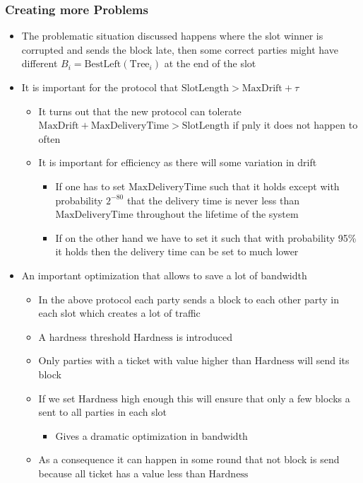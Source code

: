 \documentclass[11pt]{article}
\begin{document}
\subsubsection{Creating more Problems}
\label{sec:orge44a70d}
\begin{itemize}
\item The problematic situation discussed happens where the slot winner is corrupted and sends the block late, then some correct parties might have different \(B_i=\text{BestLeft}(\text{Tree}_i)\) at the end of the slot

\item It is important for the protocol that \(\text{SlotLength}> \text{MaxDrift} + \tau\) 
\begin{itemize}
\item It turns out that the new protocol can tolerate \(\text{MaxDrift}+ \text{MaxDeliveryTime} > \text{SlotLength}\) if pnly it does not happen to often
\item It is important for efficiency as there will some variation in drift
\begin{itemize}
\item If one has to set \(\text{MaxDeliveryTime}\) such that it holds except with probability \(2^{−80}\) that the delivery time is never less than \(\text{MaxDeliveryTime}\) throughout the lifetime of the system
\item If on the other hand we have to set it such that with probability 95\% it holds then the delivery time can be set to much lower
\end{itemize}
\end{itemize}

\item An important optimization that allows to save a lot of bandwidth
\begin{itemize}
\item In the above protocol each party sends a block to each other party in each slot which creates a lot of traffic
\item A hardness threshold \(\text{Hardness}\) is introduced
\item Only parties with a ticket with value higher than \(\text{Hardness}\) will send its block
\item If we set \(\text{Hardness}\) high enough this will ensure that only a few blocks a sent to all parties in each slot
\begin{itemize}
\item Gives a dramatic optimization in bandwidth
\end{itemize}
\item As a consequence it can happen in some round that not block is send because all ticket has a value less than \(\text{Hardness}\)
\end{itemize}
\end{itemize}
\end{document}
